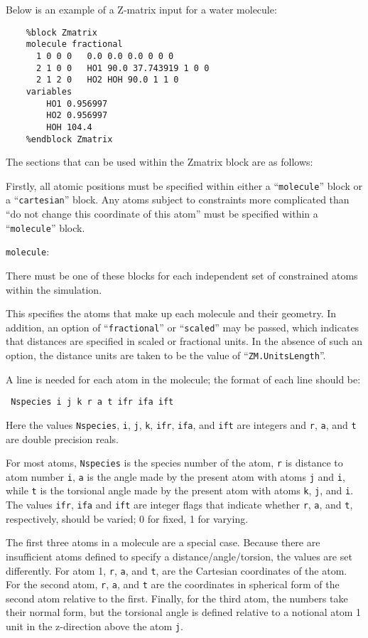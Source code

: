 \documentclass[11pt]{article}
\begin{document}
\begin{description}
Below is an example of a Z-matrix input for a water molecule:
\begin{verbatim}
    %block Zmatrix
    molecule fractional
      1 0 0 0   0.0 0.0 0.0 0 0 0
      2 1 0 0   HO1 90.0 37.743919 1 0 0
      2 1 2 0   HO2 HOH 90.0 1 1 0
    variables
        HO1 0.956997
        HO2 0.956997
        HOH 104.4
    %endblock Zmatrix
\end{verbatim}

The sections that can be used within the Zmatrix block are as follows:

Firstly, all atomic positions must be specified within either a 
``\texttt{molecule}'' block or a ``\texttt{cartesian}'' block. 
Any atoms subject to
constraints more complicated than ``do not change this coordinate
of this atom'' must be specified within a ``\texttt{molecule}'' block.

\item \texttt{molecule}: 

There must be one of these blocks for each independent set of
constrained atoms within the simulation.

This specifies the atoms that make up each molecule and their
geometry. In addition, an option of ``\texttt{fractional}'' or ``\texttt{scaled}''
may be passed, which indicates that distances are specified
in scaled or fractional units. In the absence of such an option, the 
distance units are taken to be the value of ``\texttt{ZM.UnitsLength}''.
 
A line is needed for each atom in the molecule; the format of each line should be:

\noindent\texttt{    Nspecies i j k r a t ifr ifa ift}

Here the values \texttt{Nspecies}, \texttt{i}, \texttt{j}, \texttt{k}, \texttt{ifr}, \texttt{ifa}, and \texttt{ift} are integers and \texttt{r}, \texttt{a}, and \texttt{t}
are double precision reals. 

For most atoms, \texttt{Nspecies} is the species number of the atom, \texttt{r} is distance to atom number
\texttt{i}, \texttt{a} is the angle made by the present atom with atoms \texttt{j} and \texttt{i}, while \texttt{t} is the torsional
angle made by the present atom with atoms \texttt{k}, \texttt{j}, and \texttt{i}. The values \texttt{ifr}, \texttt{ifa} and \texttt{ift} are
integer flags that indicate whether \texttt{r}, \texttt{a}, and \texttt{t}, respectively, should be varied; 0 for fixed, 1 for varying.


The first three atoms in a molecule are a special case. Because there are insufficient
atoms defined to specify a distance/angle/torsion, the values are set differently. For
atom 1, \texttt{r}, \texttt{a}, and \texttt{t}, are the Cartesian coordinates of the atom.  For the
second atom, \texttt{r}, \texttt{a}, and \texttt{t} are the coordinates in spherical form of the second atom
relative to the first. Finally, for the third atom, the numbers take their normal form,
but the torsional angle is defined relative to a notional atom 1 unit in the z-direction
above the atom \texttt{j}.


\end{description}
\end{document}
